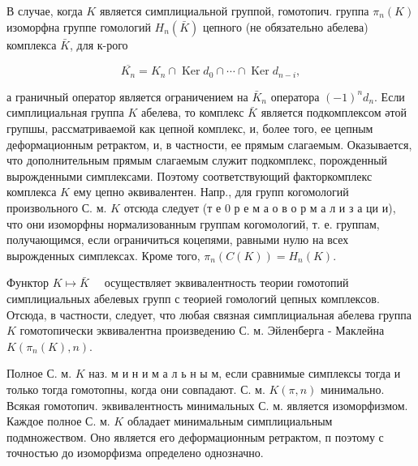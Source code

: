 \documentclass[10pt]{article}
\begin{document}
В случае, когда $K$ является симплициальной группой, гомотопич. группа $\pi_{n}(K)$ изоморфна группе гомологий $H_{n}(\bar{K})$ цепного (не обязательно абелева) комплекса $\bar{K}$, для к-рого



\[

\overline{K_{n}}=K_{n} \cap \operatorname{Ker} d_{0} \cap \cdots \cap \operatorname{Ker} d_{n-i},

\]



а граничный оператор является ограничением на $\bar{K}_{n}$ оператора $(-1)^{n} d_{n}$. Если симплициальная группа $K$ абелева, то комплекс $\bar{K}$ является подкомплексом әтой групшы, рассматриваемой как цепной комплекс, и, более того, ее цепным деформационным ретрактом, и, в частности, ее прямым слагаемым. Оказывается, что дополнительным прямым слагаемым служит подкомплекс, порожденный вырожденными симплексами. Поэтому соответствующий факторкомплекс комплекса $K$ ему цепно әквивалентен. Напр., для групп когомологий произвольного С. м. $K$ отсюда следует (т е 0 р е м а о в о р м а л и з а ци и), что они изоморфны нормализованным группам когомологий, т. е. группам, получающимся, если ограничиться коцепями, равными нулю на всех вырожденных симплексах. Кроме того, $\pi_{n}(C(K))=H_{n}(K)$.



Функтор $K \longmapsto \bar{K} \quad$ осуществляет эквивалентность теории гомотопий симплициальных абелевых групп с теорией гомологий цепных комплексов. Отсюда, в частности, следует, что любая связная симплициальная абелева группа $K$ гомотопически эквивалентна произведению С. м. Эйленберга - Маклейна $K\left(\pi_{n}(K), n\right)$.



Полное С. м. $K$ наз. м и н и м а л ь н ы м, если сравнимые симплексы тогда и только тогда гомотопны, когда они совпадают. С. м. $K(\pi, n)$ минимально. Всякая гомотопич. эквивалентность минимальных С. м. является изоморфизмом. Каждое полное С. м. $K$ обладает минимальным симплициальным подмножеством. Оно является его деформационным ретрактом, п поэтому с точностью до изоморфизма определено однозначно.
\end{document}
